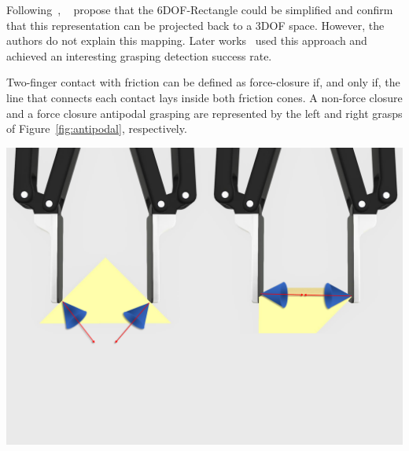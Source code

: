 Following~\cite{Jiang2011a}, \citeauthor{Lenz2015}~\cite{Lenz2015} propose that the 6DOF-Rectangle could be simplified and confirm that this representation can be projected back to a 3DOF space. However, the authors do not explain this mapping. Later works~\cite{Redmon2015,Watson2017,Gariepy2019,asif2018ensemblenet} used this approach and achieved an interesting grasping detection success rate. 

\begin{tcolorbox}[every float=\centering, drop shadow, title= Antipodal Grasping]

 Two-finger contact with friction can be defined as force-closure if, and only if,  the line that connects each contact lays inside both friction cones. A non-force closure and a force closure antipodal grasping are represented by the left and right grasps of Figure~\ref{fig:antipodal}, respectively.

\vspace*{1ex}

\centerline{\includegraphics[trim={0cm 10cm 0cm 0cm},clip,width=.5\linewidth,angle=0]{Cap2/Figuras/antipodal_2.pdf}}
\label{fig:antipodal}
\end{tcolorbox}


